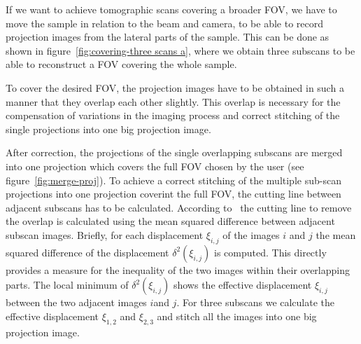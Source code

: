 If we want to achieve tomographic scans covering a broader FOV, we have to move the sample in relation to the beam and camera, to be able to record projection images from the lateral parts of the sample. This can be done as shown in figure~\ref{fig:covering-three scans a},  where we obtain three subscans to be able to reconstruct a FOV covering the whole sample.

\begin{figure*}[tb]
	\centering
	
	\caption{Covering the FOV -- three scans $\rightarrow$ sample has to move, explain that we still only do \SI{180}{\degree} scans!}
	\label{fig:covering-three scans a}
\end{figure*}

\begin{figure*}[tb]
	\centering
	
	\caption{Or is this better for the understanding?: Covering the FOV -- three scans $\rightarrow$ sample has to move, explain that we still only do \SI{180}{\degree} scans!}
	\label{fig:covering-three scans b}
\end{figure*}

To cover the desired FOV, the projection images have to be obtained in such a manner that they overlap each other slightly. This overlap is necessary for the compensation of variations in the imaging process and correct stitching of the single projections into one big projection image. 

After correction, the projections of the single overlapping subscans are merged into one projection which covers the full FOV chosen by the user (see figure~\ref{fig:merge-proj}). To achieve a correct stitching of the multiple sub-scan projections into one projection coverint the full FOV, the cutting line between adjacent subscans has to be calculated. According to~\citet{Hintermueller2009} the cutting line to remove the overlap is calculated using the mean squared difference between adjacent subscan images. Briefly, for each displacement $\xi_{i,j}$ of the images $i$ and $j$ the mean squared difference of the displacement $\delta^2(\xi_{i,j})$ is computed. This directly provides a measure for the inequality of the two images within their overlapping parts. The local minimum of $\delta^2(\xi_{i,j})$ shows the effective displacement $\xi_{i,j}$ between the two adjacent images $i$and $j$. For three subscans we calculate the effective displacement $\xi_{1,2}$ and $\xi_{2,3}$ and stitch all the images into one big projection image.

